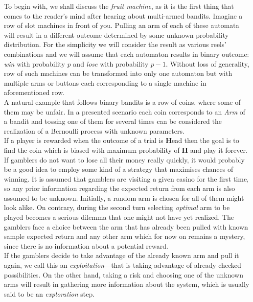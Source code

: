 \documentclass[12pt, a4paper, pdflatex, leqno, twoside]{report}
\begin{document}
To begin with, we shall discuss the \emph{fruit machine}, as it is the first thing that 
comes to the reader's mind after hearing about multi-armed bandits. Imagine a row of 
slot machines in front of you. Pulling an arm of each of these automata will result in a different 
outcome determined by some unknown probability distribution. For the simplicity 
we will consider the result as various reels' combinations and we will assume that each automaton results in binary 
outcome: \emph{win} with probability $p$ and \emph{lose} with probability $p-1$. Without loss of generality, 
row of such machines can be transformed into only one automaton but with multiple arms or buttons each corresponding 
to a single machine in aforementioned row.\\

A natural example that follows binary bandits is a row of coins, where some 
of them may be unfair. In a presented scenario each coin corresponds to an 
\emph{Arm} of a bandit and tossing one of them for several times can be 
considered the realization of a Bernoulli process with unknown parameters.\\
If a player is rewarded when the outcome of a trial is \textbf{H}ead then the 
goal is to find the coin which is biased with maximum probability of \textbf{H} 
and play it forever.\\

If gamblers do not want to lose all their money really quickly, it would probably
be a good idea to employ some kind of a strategy that maximises chances of 
winning. It is assumed that gamblers are visiting a given casino for the first time, 
so any prior information regarding the expected return from each arm is also assumed to 
be unknown. Initially, a random arm is chosen for all of them might look alike. On 
contrary, during the second turn selecting \emph{optimal} arm to be played 
becomes a serious dilemma that one might not have yet realized. The gamblers 
face a choice between the arm that has already been pulled with known sample expected return and any other arm which for now on remains a mystery, since there is no 
information about a potential reward.\\
If the gamblers decide to take advantage of the already known arm and pull it again, we 
call this an \emph{exploitation}---that is taking advantage of already 
checked possibilities. On the other hand, taking a risk and choosing one of the 
unknown arms will result in gathering more information about the system, 
which is usually said to be an \emph{exploration} step.\\
\end{document}
